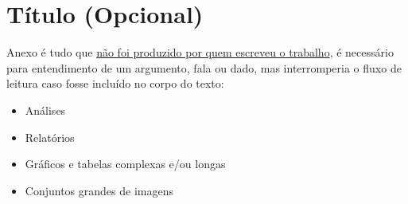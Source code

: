 \chapter{Título (Opcional)}
Anexo é tudo que \underline{não foi produzido por quem escreveu o trabalho}, é necessário para entendimento de um argumento, fala ou dado, mas interromperia o fluxo de leitura caso fosse incluído no corpo do texto: 

\begin{itemize}
    \item Análises 
    \item Relatórios 
    \item Gráficos e tabelas complexas e/ou longas 
    \item Conjuntos grandes de imagens 
\end{itemize}